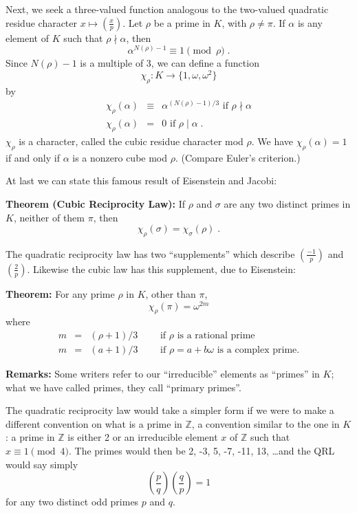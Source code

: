 \documentclass[12pt]{article}
\newcommand{\legsymp}[1]{\left(\frac{#1}{p}\right)}
\newcommand{\Z}{\mathbb{Z}}
\begin{document}
Next, we seek a three-valued function analogous to the
two-valued quadratic residue character $x\mapsto\legsymp{x}$.
Let $\rho$ be a prime in $K$, with $\rho\ne\pi$. If $\alpha$ is any
element of $K$ such that $\rho\nmid\alpha$, then
$$\alpha^{N(\rho)-1}\equiv 1\pmod{\rho}\;.$$
Since $N(\rho)-1$ is a multiple of 3, we can define a function
$$\chi_\rho:K\to\{1,\omega,\omega^2\}$$
by
\begin{eqnarray*}
\chi_\rho(\alpha)&\equiv&\alpha^{(N(\rho)-1)/3}\text{ if }\rho\nmid\alpha
\\
\chi_\rho(\alpha)&=&0\text{ if }\rho\mid\alpha\;.
\end{eqnarray*}
$\chi_\rho$ is a character, called the cubic residue character mod $\rho$.
We have $\chi_\rho(\alpha)=1$ if and only if $\alpha$ is a nonzero cube
mod $\rho$. (Compare Euler's criterion.)

At last we can state this famous result of Eisenstein and Jacobi:

\noindent
\textbf{Theorem (Cubic Reciprocity Law): }
If $\rho$ and $\sigma$ are any two distinct
primes in $K$, neither of them $\pi$, then
$$\chi_\rho(\sigma)=\chi_\sigma(\rho)\;.$$

The quadratic reciprocity law has two ``supplements'' which describe
$\legsymp{-1}$ and $\legsymp{2}$. Likewise the cubic law has this supplement,
due to Eisenstein:

\noindent
\textbf{Theorem:} For any prime $\rho$ in $K$, other than $\pi$,
$$\chi_\rho(\pi)=\omega^{2m}$$
where
\begin{eqnarray*}
m&=&(\rho+1)/3\qquad\text{ if $\rho$ is a rational prime}
\\
m&=&(a+1)/3\qquad\text{ if $\rho=a+b\omega$ is a complex prime.}
\end{eqnarray*}

\textbf{Remarks: }Some writers refer to our ``irreducible'' elements
as ``primes'' in $K$; what we have called primes, they call ``primary primes''.

The quadratic reciprocity law would take a simpler form if we were to
make a different convention on what is a prime in $\Z$, a convention
similar to the one in $K$: a prime in $\Z$ is either 2 or an
irreducible element $x$ of $\Z$ such that $x\equiv 1\pmod 4$.
The primes would then be 2, -3, 5, -7, -11, 13, \ldots and the QRL
would say simply
$$\left(\frac{p}{q}\right)\left(\frac{q}{p}\right)=1$$
for any two distinct odd primes $p$ and $q$.
\end{document}
